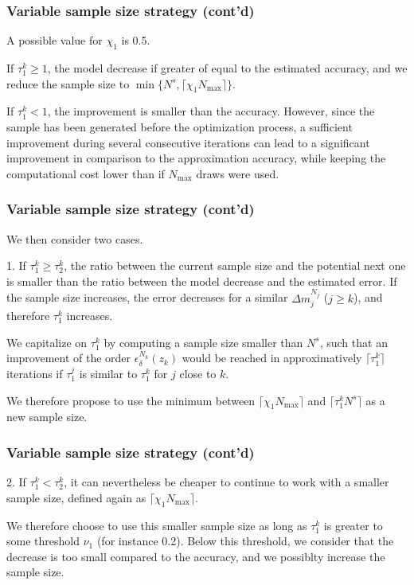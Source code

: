 \documentclass{beamer}
\begin{document}
\begin{frame}
\frametitle{Variable sample size strategy (cont'd)}

A possible value for $\chi_1$ is 0.5.

\mbox{}

If $\tau_1^k \geq 1$, the model decrease if greater of equal to the estimated accuracy, and we reduce the sample size to $\min\{ N^s, \lceil \chi_1 N_{\max}
\rceil \}$.

\mbox{}

If $\tau_1^k < 1$, the improvement is smaller than the accuracy.
However, since the sample has been generated before the optimization process, a sufficient improvement during several consecutive iterations can lead to a significant improvement in comparison to the approximation accuracy, while keeping the computational cost lower than if $N_{\max}$ draws were used.

\end{frame}

\begin{frame}
\frametitle{Variable sample size strategy (cont'd)}

We then consider two cases.

\mbox{}

1. If $\tau_1^k \geq \tau_2^k$, the ratio between the current sample size and the potential next one is smaller than the ratio between the model decrease and the estimated error.
If the sample size increases, the error decreases for a similar $\Delta m_j^{N_j}$ ($j \geq k$), and therefore $\tau_1^k$ increases.

\mbox{}

We capitalize on $\tau_1^k$ by computing a sample size smaller than  $N^s$, such that an improvement of the order $\epsilon_\delta^{N_k}(z_k)$ would be reached in approximatively $\lceil \tau_1^k \rceil$ iterations if $\tau_1^j$ is similar to $\tau_1^k$ for $j$ close to $k$.

\mbox{}

We therefore propose to use the minimum between $\lceil \chi_1 N_{\max} \rceil$ and $\lceil \tau_1^k N^s \rceil$ as a new sample size.

\end{frame}

\begin{frame}
\frametitle{Variable sample size strategy (cont'd)}

2. If $\tau_1^k < \tau_2^k$, it can nevertheless be cheaper to continue to work with a smaller sample size, defined again as $\lceil \chi_1 N_{\max} \rceil$.

\mbox{}

We therefore choose to use this smaller sample size as long as $\tau_1^k$ is greater to some threshold $\nu_1$ (for instance 0.2).
Below this threshold, we consider that the decrease is too small compared to the accuracy, and we possiblty increase the sample size.

\end{frame}
\end{document}
